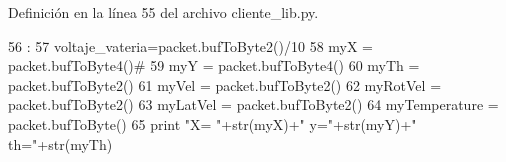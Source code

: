 Definición en la línea 55 del archivo cliente\_\-lib.py.


\begin{DoxyCode}
56                    :
57         voltaje_vateria=packet.bufToByte2()/10
58         myX = packet.bufToByte4()#
59         myY = packet.bufToByte4()
60         myTh = packet.bufToByte2()
61         myVel = packet.bufToByte2()
62         myRotVel = packet.bufToByte2()
63         myLatVel = packet.bufToByte2()
64         myTemperature = packet.bufToByte()
65         print "X= "+str(myX)+" y="+str(myY)+" th="+str(myTh)

\end{DoxyCode}
